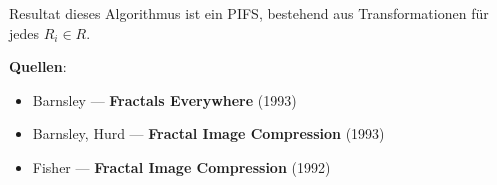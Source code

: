 \documentclass[afourpaper]{latex-classes/handout}
\begin{document}
Resultat dieses Algorithmus ist ein PIFS, bestehend aus Transformationen für jedes \( R_i \in R \).



\begin{marginfigure}
  \textbf{Quellen}:
  \begin{itemize}
    \item Barnsley --- \textbf{Fractals Everywhere} (1993)
    \item Barnsley, Hurd --- \textbf{Fractal Image Compression} (1993)
    \item Fisher --- \textbf{Fractal Image Compression} (1992)
  \end{itemize}
\end{marginfigure}
\end{document}

